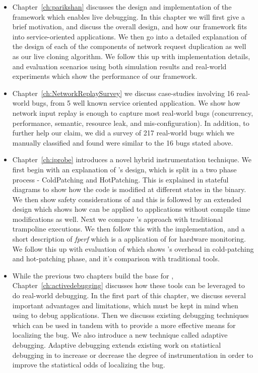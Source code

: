 \begin{itemize}
	\item Chapter~\ref{ch:parikshan} discusses the design and implementation of the \parikshan framework which enables live debugging.
	In this chapter we will first give a brief motivation, and discuss the overall design, and how our framework fits into service-oriented applications.
	We then go into a detailed explanation of the design of each of the components of network request duplication as well as our live cloning algorithm.
	We follow this up with implementation details, and evaluation scenarios using both simulation results and real-world experiments which show the performance of our framework. 
	
	\item Chapter~\ref{ch:NetworkReplaySurvey} we discuss case-studies involving 16 real-world bugs, from 5 well known service oriented application.
	We show how network input replay is enough to capture most real-world bugs (concurrency, performance, semantic, resource leak, and mis-configuration).
	In addition, to further help our claim, we did a survey of 217 real-world bugs which we manually classified and found were similar to the 16 bugs stated above.
	
	\item Chapter~\ref{ch:iprobe} introduces \iprobe a novel hybrid instrumentation technique. 	
	We first begin with an explanation of \iprobe's design, which is split in a two phase process - ColdPatching and HotPatching. This is explained in stateful diagrams to show how the code is modified at different states in the binary.
	We then show safety considerations of \iprobe and this is followed by an extended design which shows how \iprobe can be applied to applications without compile time modifications as well. 
	Next we compare \iprobe's approach with traditional trampoline executions. We then follow this with the implementation, and a short description of \textit{fperf} which is a application of \iprobe for hardware monitoring. 
	We follow this up with evaluation of \iprobe which shows \iprobe's overhead in cold-patching and hot-patching phase, and it's comparison with traditional tools.
	
	
	\item While the previous two chapters build the base for \livedebugging, Chapter~\ref{ch:activedebugging} discusses how these tools can be leveraged to do real-world debugging. In the first part of this chapter, we discuss several important advantages and limitations, which must be kept in mind when using \parikshan to debug applications. 
	Then we discusss existing debugging techniques which can be used in tandem with \livedebugging to provide a more effective means for localizing the bug.
	We also introduce a new technique called adaptive debugging. Adaptive debugging extends existing work on statistical debugging in  \parikshan to increase or decrease the degree of instrumentation in order to improve the statistical odds of localizing the bug.
	

\end{itemize}
